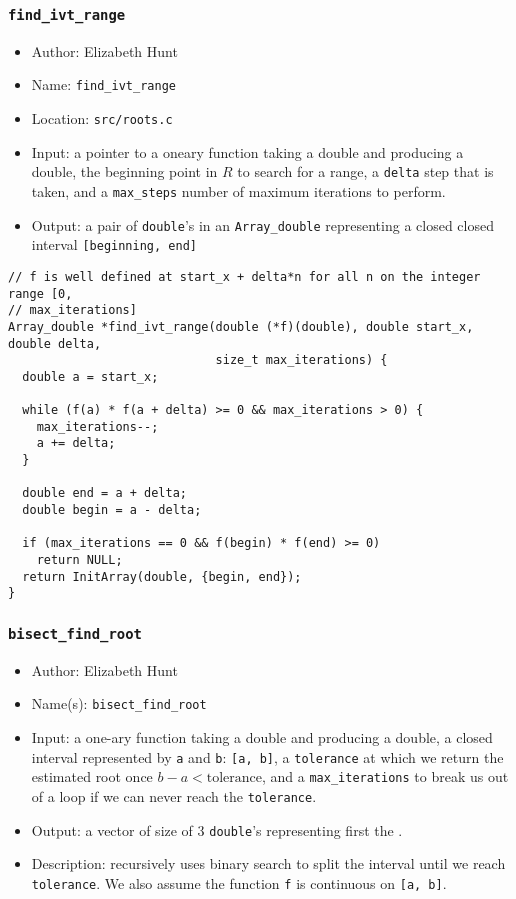 \documentclass[11pt]{article}
\begin{document}
\subsubsection{\texttt{find\_ivt\_range}}
\label{sec:orgc1dde4d}
\begin{itemize}
\item Author: Elizabeth Hunt
\item Name: \texttt{find\_ivt\_range}
\item Location: \texttt{src/roots.c}
\item Input: a pointer to a oneary function taking a double and producing a double, the beginning point
in \(R\) to search for a range, a \texttt{delta} step that is taken, and a \texttt{max\_steps} number of maximum
iterations to perform.
\item Output: a pair of \texttt{double}'s in an \texttt{Array\_double} representing a closed closed interval \texttt{[beginning, end]}
\end{itemize}

\begin{verbatim}
// f is well defined at start_x + delta*n for all n on the integer range [0,
// max_iterations]
Array_double *find_ivt_range(double (*f)(double), double start_x, double delta,
                             size_t max_iterations) {
  double a = start_x;

  while (f(a) * f(a + delta) >= 0 && max_iterations > 0) {
    max_iterations--;
    a += delta;
  }

  double end = a + delta;
  double begin = a - delta;

  if (max_iterations == 0 && f(begin) * f(end) >= 0)
    return NULL;
  return InitArray(double, {begin, end});
}
\end{verbatim}
\subsubsection{\texttt{bisect\_find\_root}}
\label{sec:orgb42a836}
\begin{itemize}
\item Author: Elizabeth Hunt
\item Name(s): \texttt{bisect\_find\_root}
\item Input: a one-ary function taking a double and producing a double, a closed interval represented
by \texttt{a} and \texttt{b}: \texttt{[a, b]}, a \texttt{tolerance} at which we return the estimated root once \(b-a < \text{tolerance}\), and a
\texttt{max\_iterations} to break us out of a loop if we can never reach the \texttt{tolerance}.
\item Output: a vector of size of 3 \texttt{double}'s representing first the .
\item Description: recursively uses binary search to split the interval until we reach \texttt{tolerance}. We
also assume the function \texttt{f} is continuous on \texttt{[a, b]}.
\end{itemize}
\end{document}
